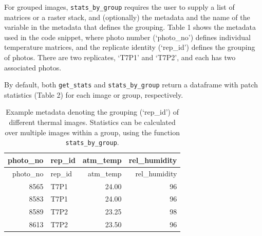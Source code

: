 \documentclass[12pt,british,a4paper,]{article}
\newenvironment{Shaded}{\begin{snugshade}}{\end{snugshade}}
\newcommand{\CommentTok}[1]{\textcolor[rgb]{0.56,0.35,0.01}{\textit{#1}}}
\newcommand{\DataTypeTok}[1]{\textcolor[rgb]{0.13,0.29,0.53}{#1}}
\newcommand{\KeywordTok}[1]{\textcolor[rgb]{0.13,0.29,0.53}{\textbf{#1}}}
\newcommand{\NormalTok}[1]{#1}
\newcommand{\OperatorTok}[1]{\textcolor[rgb]{0.81,0.36,0.00}{\textbf{#1}}}
\newcommand{\OtherTok}[1]{\textcolor[rgb]{0.56,0.35,0.01}{#1}}
\newcommand{\StringTok}[1]{\textcolor[rgb]{0.31,0.60,0.02}{#1}}
\begin{document}
\begin{Shaded}
\end{Shaded}

For grouped images, \texttt{stats\_by\_group} requires the user to supply a list of matrices or a raster stack, and (optionally) the metadata and the name of the variable in the metadata that defines the grouping. Table 1 shows the metadata used in the code snippet, where photo number (`photo\_no') defines individual temperature matrices, and the replicate identity (`rep\_id') defines the grouping of photos. There are two replicates, `T7P1' and `T7P2', and each has two associated photos.

By default, both \texttt{get\_stats} and \texttt{stats\_by\_group} return a dataframe with patch statistics (Table 2) for each image or group, respectively.

\begin{longtable}[]{@{}rlrr@{}}
\caption{Example metadata denoting the grouping (`rep\_id') of different thermal images. Statistics can be calculated over multiple images within a group, using the function \texttt{stats\_by\_group}.}\tabularnewline
\toprule
photo\_no & rep\_id & atm\_temp & rel\_humidity\tabularnewline
\midrule
\endfirsthead
\toprule
photo\_no & rep\_id & atm\_temp & rel\_humidity\tabularnewline
\midrule
\endhead
8565 & T7P1 & 24.00 & 96\tabularnewline
8583 & T7P1 & 24.00 & 96\tabularnewline
8589 & T7P2 & 23.25 & 98\tabularnewline
8613 & T7P2 & 23.50 & 96\tabularnewline
\bottomrule
\end{longtable}
\end{document}
